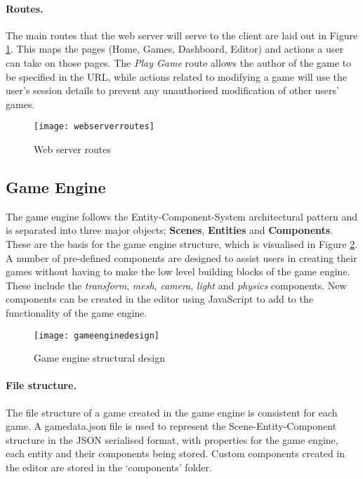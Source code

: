 
	\paragraph{Routes.}
	The main routes that the web server will serve to the client are laid out in Figure \ref{fig:webserverroutes}. This maps the pages (Home, Games, Dashboard, Editor) and actions a user can take on those pages. The \emph{Play Game} route allows the author of the game to be specified in the URL, while actions related to modifying a game will use the user's session details to prevent any unauthorised modification of other users' games.

	\begin{figure}[h]
		\centering
		\texttt{[image: webserverroutes]}
		\caption{Web server routes}
		\label{fig:webserverroutes}
	\end{figure}

	\subsection{Game Engine}
	The game engine follows the Entity-Component-System architectural pattern and is separated into three major objects; \textbf{Scenes}, \textbf{Entities} and \textbf{Components}. These are the basis for the game engine structure, which is visualised in Figure \ref{fig:gameenginedesign}. A number of pre-defined components are designed to assist users in creating their games without having to make the low level building blocks of the game engine. These include the \emph{transform}, \emph{mesh}, \emph{camera}, \emph{light} and \emph{physics} components. New components can be created in the editor using JavaScript to add to the functionality of the game engine.


	\begin{figure}[h]
		\centering
		\texttt{[image: gameenginedesign]}
		\caption{Game engine structural design}
		\label{fig:gameenginedesign}
	\end{figure}

	\paragraph{File structure.}
	The file structure of a game created in the game engine is consistent for each game. A gamedata.json file is used to represent the Scene-Entity-Component structure in the JSON serialised format, with properties for the game engine, each entity and their components being stored. Custom components created in the editor are stored in the `components' folder.

